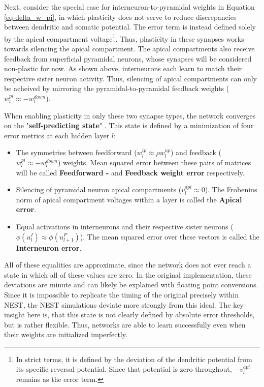 Next, consider the special case for interneuron-to-pyramidal weights in Equation \ref{eq-delta_w_pi}, in which
plasticity does not serve to reduce discrepancies between dendritic and somatic potential. The error term is instead
defined solely by the apical compartment voltage\footnote{In strict terms, it is defined by the deviation of the
dendritic potential from its specific reversal potential. Since that potential is zero throughout, $- v_l^{api}$ remains
as the error term.}. Thus, plasticity in these synapses works towards silencing the apical compartment. The apical
compartments also receive feedback from superficial pyramidal neurons, whose synapses will be considered non-plastic for
now. As shown above, interneurons each learn to match their respective sister neuron activity. Thus, silencing of apical
compartments can only be acheived by mirroring the pyramidal-to-pyramidal feedback weights ($w_l^{pi} \approx
-w_l^{down}$).\newline

When enabling plasticity in only these two synapse types, the network converges on the "\textbf{self-predicting state}"
\citep{sacramento2018dendritic}. This state is defined by a minimization of four error metrics at each hidden layer $l$:

\begin{itemize}
  \item The symmetries between feedforward ($w_l^{ip} \approx \rho w_l^{up}$) and feedback ($w_l^{pi} \approx
          -w_l^{down}$) weights. Mean squared error between these pairs of matrices will be called \textbf{Feedforward -
          } and \textbf{Feedback weight error} respectively.
  \item Silencing of pyramidal neuron apical compartments ($v_l^{api} \approx 0$). The Frobenius norm \citeme of apical
        compartment voltages within a layer is called the \textbf{Apical error}.
  \item Equal activations in interneurons and their respective sister neurons ($\phi (u_l^I) \approx \phi (u_{l+1}^P)$).
        The mean squared error over these vectors is called the \textbf{Interneuron error}.
\end{itemize}


All of these equalities are approximate, since the network does not ever reach a state in which all of these values are
zero. In the original implementation, these deviations are minute and can likely be explained with floating point
conversions. Since it is impossible to replicate the timing of the original precisely within NEST, the NEST simulations
deviate more strongly from this ideal. The key insight here is, that this state is not clearly defined by absolute error
thresholds, but is rather flexible. Thus, networks are able to learn successfully even when their weights are
initialized imperfectly. 

